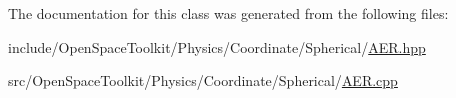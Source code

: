 The documentation for this class was generated from the following files\+:\begin{DoxyCompactItemize}
\item 
include/\+Open\+Space\+Toolkit/\+Physics/\+Coordinate/\+Spherical/\hyperlink{_a_e_r_8hpp}{A\+E\+R.\+hpp}\item 
src/\+Open\+Space\+Toolkit/\+Physics/\+Coordinate/\+Spherical/\hyperlink{_a_e_r_8cpp}{A\+E\+R.\+cpp}\end{DoxyCompactItemize}
